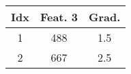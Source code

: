 \documentclass{standalone}
\begin{document}
	\begin{tabular}{cc|c}
		\toprule
		Idx & Feat. 3 & Grad.\\
		\midrule
		\rowcolor{CBOne}
		1 & 488 & 1.5 \\
		\rowcolor{CBTwo}
		2& 667 & 2.5 \\
		\bottomrule
	\end{tabular}
\end{document}
